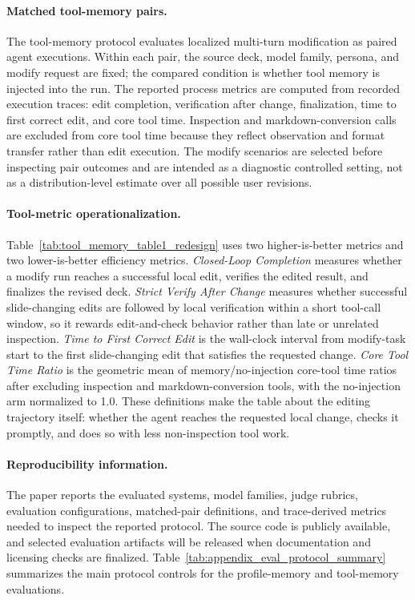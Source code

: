 \documentclass{llmxive}
\begin{document}
\paragraph{Matched tool-memory pairs.}
The tool-memory protocol evaluates localized multi-turn modification as paired
agent executions. Within each pair, the source deck, model family, persona, and
modify request are fixed; the compared condition is whether tool memory is
injected into the run. The reported process metrics are computed from recorded
execution traces: edit completion, verification after change, finalization,
time to first correct edit, and core tool time. Inspection and
markdown-conversion calls are excluded from core tool time because they reflect
observation and format transfer rather than edit execution. The modify
scenarios are selected before inspecting pair outcomes and are intended as a
diagnostic controlled setting, not as a distribution-level estimate over all
possible user revisions. 
\paragraph{Tool-metric operationalization.}
Table~\ref{tab:tool_memory_table1_redesign} uses two higher-is-better metrics
and two lower-is-better efficiency metrics. \textit{Closed-Loop Completion}
measures whether a modify run reaches a successful local edit, verifies the
edited result, and finalizes the revised deck. \textit{Strict Verify After
Change} measures whether successful slide-changing edits are followed by local
verification within a short tool-call window, so it rewards edit-and-check
behavior rather than late or unrelated inspection. \textit{Time to First Correct
Edit} is the wall-clock interval from modify-task start to the first
slide-changing edit that satisfies the requested change. \textit{Core Tool Time
Ratio} is the geometric mean of memory/no-injection core-tool time ratios after
excluding inspection and markdown-conversion tools, with the no-injection arm
normalized to 1.0. These definitions make the table about the editing
trajectory itself: whether the agent reaches the requested local change, checks
it promptly, and does so with less non-inspection tool work.

\paragraph{Reproducibility information.}
The paper reports the evaluated systems, model families, judge rubrics,
evaluation configurations, matched-pair definitions, and trace-derived metrics
needed to inspect the reported protocol. The source code is publicly available,
and selected evaluation artifacts will be released when documentation and
licensing checks are finalized.
Table~\ref{tab:appendix_eval_protocol_summary} summarizes the main protocol
controls for the profile-memory and tool-memory evaluations.
\end{document}
